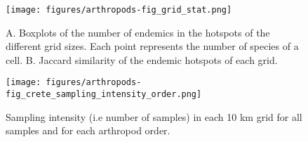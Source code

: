    \begin{figure}[h]
      \centering
      \texttt{[image: figures/arthropods-fig\_grid\_stat.png]}
      \caption[Grid size comparison for the hotspots]{A. Boxplots of the number of endemics in the hotspots of the different grid sizes. Each point represents the number of species of a cell. B. Jaccard similarity of the endemic hotspots of each grid.}
      \label{fig:arthropods-figS6}
   \end{figure}

   \begin{figure}[h]
      \centering
      \texttt{[image: figures/arthropods-fig\_crete\_sampling\_intensity\_order.png]}
      \caption[Sampling intensity for every order]{Sampling intensity (i.e number of samples) in each 10 km grid for all samples and for each arthropod order.}
      \label{fig:arthropods-figS7}
   \end{figure}


